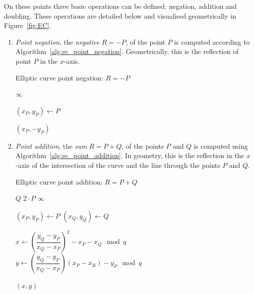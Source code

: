 On these points three basic operations can be defined: negation, addition and
doubling. These operations are detailed below and visualised geometrically in
Figure~\ref{fig:EC}.
\begin{enumerate}
  \item \emph{Point negation}, the \emph{negative} $R = -P$, of the point $P$
    is computed according to Algorithm~\ref{alg:ec_point_negation}.
    Geometrically, this is the reflection of point $P$ in the $x$-axis.
    \begin{algorithm}[H]
      \caption{Elliptic curve point negation: $R = -P$}
      \label{alg:ec_point_negation}

      \begin{algorithmic}[1]
            \Return $\infty$
          \EndIf

          \State $(x_P, y_P) \gets P$

          \Return $(x_P, -y_P)$
        \EndFunction
      \end{algorithmic}
    \end{algorithm}

  \item \emph{Point addition}, the \emph{sum} $R = P + Q$, of the points $P$
    and $Q$ is computed using Algorithm~\ref{alg:ec_point_addition}.
    In geometry, this is the reflection in the $x$-axis of the intersection of
    the curve and the line through the points $P$ and $Q$.
    \begin{algorithm}[H]
      \caption{Elliptic curve point addition: $R = P + Q$}
      \label{alg:ec_point_addition}

      \begin{algorithmic}[1]
            \Return $Q$
          \EndIf
            \Return $2 \cdot P$
          \EndIf
            \Return $\infty$
          \EndIf

          \State $(x_P, y_P) \gets P$
          \State $(x_Q, y_Q) \gets Q$

          \State $x \gets \left(\dfrac{y_Q - y_P}{x_Q - x_P}\right)^2 - x_P - x_Q \mod q$
          \State $y \gets \left(\dfrac{y_Q - y_P}{x_Q - x_P}\right) (x_P - x_R) - y_P \mod q$

          \Return $(x, y)$
        \EndFunction
      \end{algorithmic}
    \end{algorithm}


\end{enumerate}
